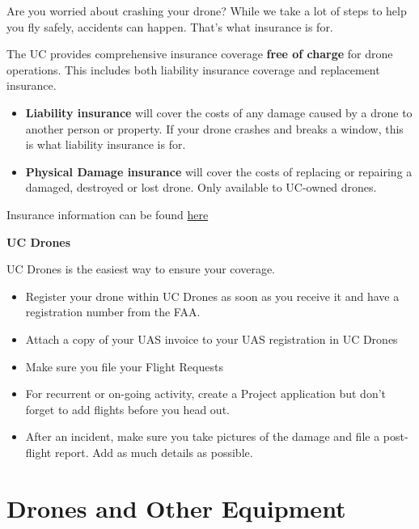 \documentclass[
  12pt,
]{book}
\providecommand{\tightlist}{%
  \setlength{\itemsep}{0pt}\setlength{\parskip}{0pt}}
\begin{document}
Are you worried about crashing your drone? While we take a lot of steps to help you fly safely, accidents can happen. That's what insurance is for.

The UC provides comprehensive insurance coverage \textbf{free of charge} for drone operations. This includes both liability insurance coverage and replacement insurance.

\begin{itemize}
\tightlist
\item
  \textbf{Liability insurance} will cover the costs of any damage caused by a drone to another person or property. If your drone crashes and breaks a window, this is what liability insurance is for.
\item
  \textbf{Physical Damage insurance} will cover the costs of replacing or repairing a damaged, destroyed or lost drone. Only available to UC-owned drones.
\end{itemize}

Insurance information can be found \href{https://ucdrones.github.io/ch-insurance.html}{here}

\textbf{UC Drones}

UC Drones is the easiest way to ensure your coverage.

\begin{itemize}
\tightlist
\item
  Register your drone within UC Drones as soon as you receive it and have a registration number from the FAA.
\item
  Attach a copy of your UAS invoice to your UAS registration in UC Drones
\item
  Make sure you file your Flight Requests
\item
  For recurrent or on-going activity, create a Project application but don't forget to add flights before you head out.
\item
  After an incident, make sure you take pictures of the damage and file a post-flight report. Add as much details as possible.
\end{itemize}

\hypertarget{drones-and-other-equipment}{%
\chapter{Drones and Other Equipment}\label{drones-and-other-equipment}}
\end{document}
